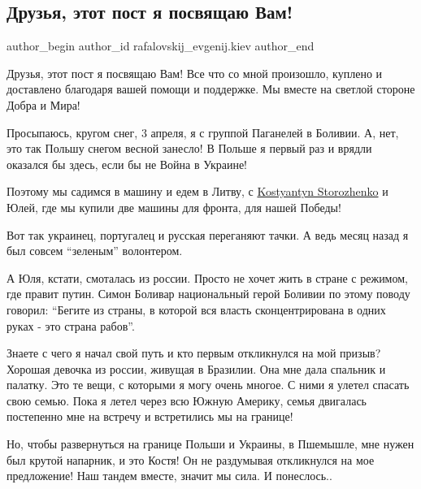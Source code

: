  
 
 
 
 
 
\subsection{Друзья, этот пост я посвящаю Вам!}
\label{sec:04_04_2022.fb.rafalovskij_evgenij.kiev.1.druzja_post}
 
\ifcmt
 author_begin
   author_id rafalovskij_evgenij.kiev
 author_end
\fi

Друзья, этот пост я посвящаю Вам! Все  что со мной произошло, куплено и
доставлено благодаря вашей помощи и поддержке. Мы вместе на светлой стороне
Добра и Мира! 

Просыпаюсь, кругом снег, 3 апреля, я с группой Паганелей в Боливии. А, нет, это
так  Польшу снегом весной занесло!   В Польше я первый раз и врядли оказался бы
здесь, если бы не Война в Украине! 

Поэтому мы садимся в машину и едем в Литву,  с
\href{https://www.facebook.com/kostyantyn.storozhenko}{Kostyantyn Storozhenko}
и Юлей, где мы купили две машины для фронта, для нашей Победы!

Вот так украинец, португалец и русская  переганяют тачки. А ведь месяц назад я
был совсем \enquote{зеленым} волонтером. 

А Юля, кстати, смоталась из россии. Просто не хочет жить в стране с режимом,
где правит путин. Симон Боливар национальный герой Боливии по этому поводу
говорил: \enquote{Бегите из страны, в которой вся власть сконцентрирована в
одних руках - это страна рабов}. 

Знаете с чего я начал свой путь и кто первым откликнулся на мой призыв?
Хорошая девочка  из россии, живущая в Бразилии. Она мне дала спальник и
палатку. Это те вещи, с которыми я могу очень многое. С ними я улетел спасать
свою семью. Пока я летел через всю Южную Америку, семья двигалась  постепенно
мне на встречу и встретились мы на границе! 

Но, чтобы развернуться на границе Польши и Украины, в Пшемышле,  мне нужен был
крутой напарник, и это Костя! Он  не раздумывая откликнулся на мое предложение!
Наш тандем вместе, значит мы сила. И понеслось..

